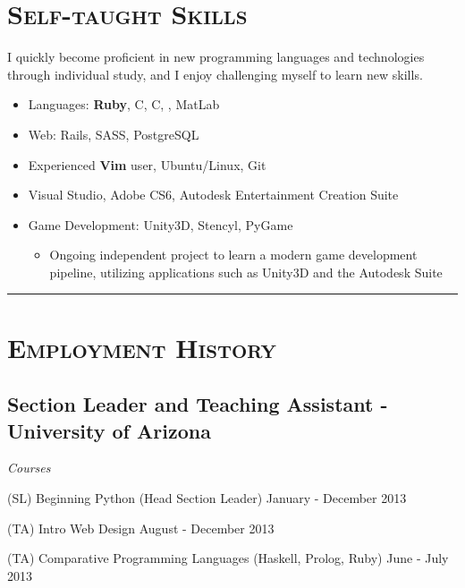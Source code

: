 \documentclass[11pt,letterpaper]{article}
\newcommand{\CPP}
{C\nolinebreak[4]\hspace{-.05em}\raisebox{.22ex}{\footnotesize\bf ++}}
\newcommand{\CS}
{C\nolinebreak[4]\hspace{-.05em}\raisebox{.22ex}{\footnotesize\bf \#}}
\newcommand{\Hsep}{\vspace{4mm} \hrule \vspace{-1mm}}
\begin{document}
\begin{minipage}{\textwidth}
\section{\scshape Self-taught Skills}
\vspace{-2mm}
I quickly become proficient in new programming languages and technologies through individual study,
and I enjoy challenging myself to learn new skills.
\vspace{3mm}
\begin{itemize}
 \item Languages: {\bfseries Ruby}, \CPP, \CS, \textls{\LaTeX}, MatLab
 \item Web: Rails, SASS, PostgreSQL
 \item Experienced {\bfseries Vim} user, Ubuntu/Linux, Git
 \item Visual Studio, Adobe CS6, Autodesk Entertainment Creation Suite
 \item Game Development: Unity3D, Stencyl, PyGame
 \begin{itemize}
  \item Ongoing independent project to learn a modern game development pipeline, utilizing applications such as Unity3D and the Autodesk Suite
 \end{itemize}

\end{itemize}

\Hsep

\section{\scshape Employment History}

\subsection{Section Leader and Teaching Assistant - {\small University of Arizona}}

\begin{adjustwidth}{2em}{0pt}
{\large \emph{Courses}}

\hspace{2em}(SL) Beginning Python {\small (Head Section Leader)} \hfill January - December 2013

\hspace{2em}(TA) Intro Web Design \hfill August - December 2013

\hspace{2em}(TA) Comparative Programming Languages {\small (Haskell, Prolog, Ruby)} \hfill June - July 2013


\end{adjustwidth}
\end{minipage}
\end{document}
